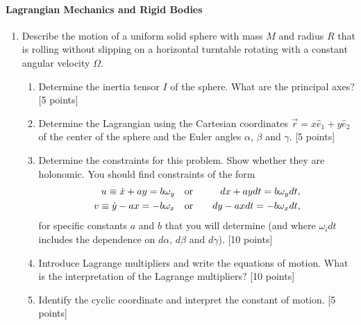 \documentclass[letterpaper,11pt]{article}
\begin{document}
\paragraph*{Lagrangian Mechanics and Rigid Bodies}
\begin{enumerate}
 \item Describe the motion of a uniform solid sphere with mass $M$ and radius $R$ that is rolling without slipping on a horizontal turntable rotating with a constant angular velocity $\Omega$.\footnotemark{}
 \begin{center}
 \end{center}
 \begin{enumerate}
  \item Determine the inertia tensor $I$ of the sphere.  What are the principal axes? [5 points]
  \item Determine the Lagrangian using the Cartesian coordinates $\vec{r} = x\hat{e}_1 + y\hat{e}_2$ of the center of the sphere and the Euler angles $\alpha$, $\beta$ and $\gamma$. [5 points]
  \item Determine the constraints for this problem.  Show whether they are holonomic.  You should find constraints of the form
  \begin{eqnarray*}
   u \equiv \dot{x} + a y = b \omega_y \quad & \hbox{or} & \quad dx + a y dt = b \omega_y dt, \\
   v \equiv \dot{y} - a x = - b \omega_x \quad & \hbox{or} & \quad dy - a x dt = - b \omega_x dt,
  \end{eqnarray*}
  for specific constants $a$ and $b$ that you will determine (and where $\omega_i dt$ includes the dependence on $d\alpha$, $d\beta$ and $d\gamma$). [10 points]
  \item Introduce Lagrange multipliers and write the equations of motion.\footnotemark{}  What is the interpretation of the Lagrange multipliers? [10 points]
  \item Identify the cyclic coordinate and interpret the constant of motion. [5 points]

\end{enumerate}
\end{enumerate}
\end{document}
